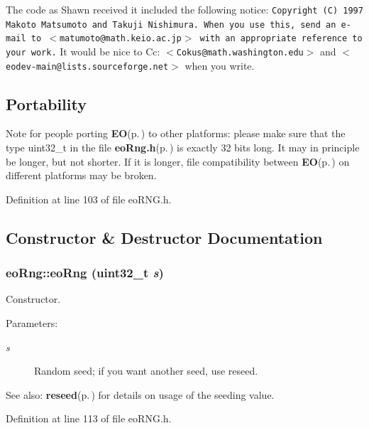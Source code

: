 The code as Shawn received it included the following notice: {\tt Copyright (C) 1997 Makoto Matsumoto and Takuji Nishimura. When you use this, send an e-mail to $<${\tt matumoto@math.keio.ac.jp}$>$ with an appropriate reference to your work.} It would be nice to Cc: $<${\tt Cokus@math.washington.edu}$>$ and $<${\tt eodev-main@lists.sourceforge.net}$>$ when you write.

\subsection*{Portability}

Note for people porting {\bf EO}{\rm (p.\,\pageref{class_e_o})} to other platforms: please make sure that the type uint32\_\-t in the file {\bf eo\-Rng.h}{\rm (p.\,\pageref{eo_r_n_g_8h})} is exactly 32 bits long. It may in principle be longer, but not shorter. If it is longer, file compatibility between {\bf EO}{\rm (p.\,\pageref{class_e_o})} on different platforms may be broken. 



Definition at line 103 of file eo\-RNG.h.

\subsection{Constructor \& Destructor Documentation}
\subsubsection{\setlength{\rightskip}{0pt plus 5cm}eo\-Rng::eo\-Rng (uint32\_\-t {\em s})\hspace{0.3cm}{\tt  [inline]}}\label{classeo_rng_a0}


Constructor. 

\begin{Desc}
\item[Parameters:]
\begin{description}
\item[{\em s}]Random seed; if you want another seed, use reseed.\end{description}
\end{Desc}
\begin{Desc}
\item[See also:]{\bf reseed}{\rm (p.\,\pageref{classeo_rng_a2})} for details on usage of the seeding value. \end{Desc}


Definition at line 113 of file eo\-RNG.h.

